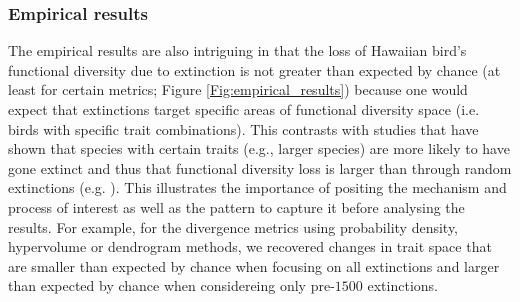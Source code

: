 \documentclass[12pt,letterpaper]{article}
\begin{document}
\subsubsection{Empirical results}

The empirical results are also intriguing in that the loss of Hawaiian bird's functional diversity due to extinction is not greater than expected by chance (at least for certain metrics; Figure \ref{Fig:empirical_results}) because one would expect that extinctions target specific areas of functional diversity space (i.e. birds with specific trait combinations).
This contrasts with studies that have shown that species with certain traits (e.g., larger species) are more likely to have gone extinct and thus that functional diversity loss is larger than through random extinctions (e.g. \citealt{sayol2021loss,Matthews2022}).
This illustrates the importance of positing the mechanism and process of interest as well as the pattern to capture it before analysing the results.
For example, for the divergence metrics using probability density, hypervolume or dendrogram methods, we recovered changes in trait space that are smaller than expected by chance when focusing on all extinctions and larger than expected by chance when considereing only pre-$1500$ extinctions.
\end{document}
